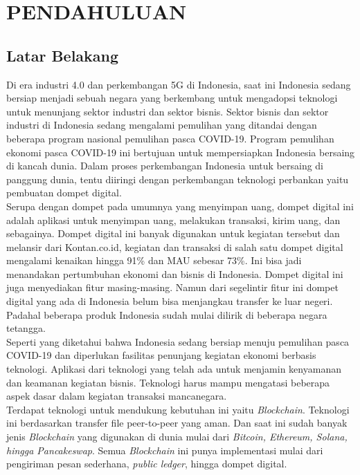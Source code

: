\chapter{PENDAHULUAN}
\label{chap:pendahuluan}


\section{Latar Belakang}
\label{sec:latarbelakang}

Di era industri 4.0 dan perkembangan 5G di Indonesia, saat ini Indonesia sedang bersiap menjadi sebuah negara yang berkembang untuk mengadopsi teknologi untuk menunjang sektor industri dan sektor bisnis. Sektor bisnis dan sektor industri di Indonesia sedang mengalami pemulihan yang ditandai dengan beberapa program nasional pemulihan pasca COVID-19. Program pemulihan ekonomi pasca COVID-19 ini bertujuan untuk mempersiapkan Indonesia bersaing di kancah dunia. Dalam proses perkembangan Indonesia untuk bersaing di panggung dunia, tentu diiringi dengan perkembangan teknologi perbankan yaitu pembuatan dompet digital. \\
Serupa dengan dompet pada umumnya yang menyimpan uang, dompet digital ini adalah aplikasi untuk menyimpan uang, melakukan transaksi, kirim uang, dan sebagainya. Dompet digital ini banyak digunakan untuk kegiatan tersebut dan melansir dari Kontan.co.id, kegiatan dan transaksi di salah satu dompet digital mengalami kenaikan hingga 91\% dan MAU sebesar 73\%. Ini bisa jadi menandakan pertumbuhan ekonomi dan bisnis di Indonesia. Dompet digital ini juga menyediakan fitur masing-masing. Namun dari segelintir fitur ini dompet digital yang ada di Indonesia belum bisa menjangkau transfer ke luar negeri. Padahal beberapa produk Indonesia sudah mulai dilirik di beberapa negara tetangga. \\
Seperti yang diketahui bahwa Indonesia sedang bersiap menuju pemulihan pasca COVID-19 dan diperlukan fasilitas penunjang kegiatan ekonomi berbasis teknologi. Aplikasi dari teknologi yang telah ada untuk menjamin kenyamanan dan keamanan kegiatan bisnis. Teknologi harus mampu mengatasi beberapa aspek dasar dalam kegiatan transaksi mancanegara.\\
Terdapat teknologi untuk mendukung kebutuhan ini yaitu \emph{Blockchain}. Teknologi ini berdasarkan transfer file peer-to-peer yang aman. Dan saat ini sudah banyak jenis \emph{Blockchain} yang digunakan di dunia mulai dari \emph{Bitcoin, Ethereum, Solana, hingga Pancakeswap}. Semua \emph{Blockchain} ini punya implementasi mulai dari pengiriman pesan sederhana, \emph{public ledger}, hingga dompet digital. 


